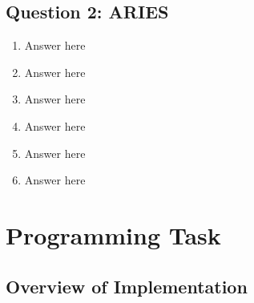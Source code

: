 \documentclass[11pt,a4paper,english]{article}
\begin{document}
\subsection*{Question 2: ARIES}
\begin{enumerate}
\item Answer here
\item Answer here
\item Answer here
\item Answer here
\item Answer here
\item Answer here
\end{enumerate}

\section*{Programming Task}
\subsection*{Overview of Implementation}
\end{document}
